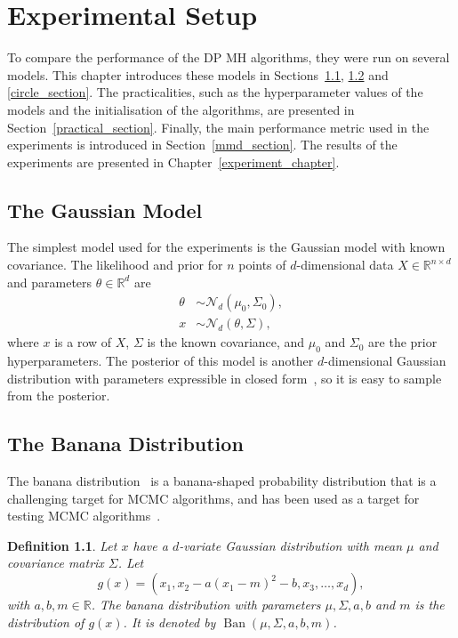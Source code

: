 \documentclass[english,twoside,openright]{HYgraduMLDS}
\newtheorem{definition}[lemma]{Definition}
\newcommand{\R}{\mathbb{R}}
\newcommand{\caln}{{\mathcal{N}}}
\DeclareMathOperator{\ban}{Ban}
\begin{document}
\chapter{Experimental Setup}\label{experiment_setup_chapter}

To compare the performance of the DP MH algorithms, they were run on
several models. This chapter introduces these models in Sections~\ref{gauss_model},
\ref{banana_section} and \ref{circle_section}. The practicalities, such as
the hyperparameter values of the models and the initialisation of the
algorithms, are presented in Section~\ref{practical_section}.
Finally, the main performance
metric used in the experiments is introduced in Section~\ref{mmd_section}.
The results of the experiments are presented in Chapter~\ref{experiment_chapter}.

\section{The Gaussian Model}\label{gauss_model}

The simplest model used for the experiments is the Gaussian model with
known covariance. The likelihood and prior for \(n\) points of \(d\)-dimensional
data \(X \in \R^{n\times d}\) and parameters \(\theta\in \R^{d}\) are
\begin{align*}
  \theta &\sim \caln_{d}(\mu_{0}, \Sigma_{0}), \\
  x &\sim \caln_{d}(\theta, \Sigma),
\end{align*}
where \(x\) is a row of \(X\), \(\Sigma\) is the known covariance,
and \(\mu_{0}\) and \(\Sigma_{0}\) are the prior hyperparameters.
The posterior of this model is another \(d\)-dimensional Gaussian distribution
with parameters expressible in closed form~\cite[Section 3.5]{BDA},
so it is easy to sample from the posterior.

\section{The Banana Distribution}\label{banana_section}

The banana distribution~\cite{TPK14} is a banana-shaped probability
distribution that is a challenging target for MCMC algorithms, and has been
used as a target for testing MCMC algorithms~\cite{TPK14}.

\begin{definition}
    Let \(x\) have a \(d\)-variate Gaussian distribution with
    mean \(\mu\) and covariance matrix \(\Sigma\). Let
    \[
        g(x) = (x_1, x_2 - a(x_1 - m)^2 - b, x_3, \dotsc, x_d),
    \]
    with \(a, b, m \in \R\).
    The banana distribution with parameters \(\mu, \Sigma, a, b\) and \(m\)
    is the distribution of \(g(x)\). It is denoted by
    \(\ban(\mu, \Sigma, a, b, m)\).
\end{definition}
\end{document}

